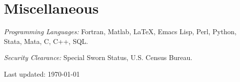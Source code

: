 \documentclass[10pt,letterpaper]{article}
\renewenvironment{itemize}{
  \begin{list}{}{
    \setlength{\leftmargin}{1.5em}
    \setlength{\itemsep}{0.25em}
    \setlength{\parskip}{0pt}
    \setlength{\parsep}{0.25em}
  }
}{
  \end{list}
}
\begin{document}
\section*{Miscellaneous}

\begin{itemize}
\item \textit{Programming Languages:} Fortran, Matlab, \LaTeX, Emacs Lisp, Perl, Python, Stata, Mata, C, C++, SQL.
\item \textit{Security Clearance:} Special Sworn Status, U.S. Census Bureau.
\end{itemize}

\bigskip
{\small Last updated: \today}
\end{document}
